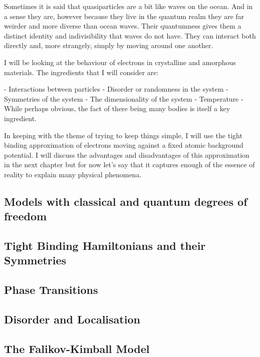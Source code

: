 Sometimes it is said that quasiparticles are a bit like waves on the ocean. And in a sense they are, however because they live in the quantum realm they are far weirder and more diverse than ocean waves. Their quantumness gives them a distinct identity and indivisibility that waves do not have. They can interact both directly and, more strangely, simply by moving around one another. 

I will be looking at the behaviour of electrons in crystalline and amorphous materials. The ingredients that I will consider are: 

\begin{markdown}
- Interactions between particles
- Disorder or randomness in the system
- Symmetries of the system
- The dimensionality of the system
- Temperature
- While perhaps obvious, the fact of there being many bodies is itself a key ingredient.
\end{markdown}

In keeping with the theme of trying to keep things simple, I will use the tight binding approximation of electrons moving against a fixed atomic background potential. I will discuss the advantages and disadvantages of this approximation in the next chapter but for now let's say that it captures enough of the essence of reality to explain many physical phenomena.

\subsection{Models with classical and quantum degrees of freedom}

\subsection{Tight Binding Hamiltonians and their Symmetries}

\subsection{Phase Transitions}

\subsection{Disorder and Localisation}

\subsection{The Falikov-Kimball Model}

